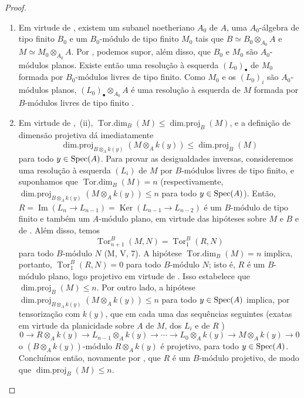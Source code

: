\begin{proof}
\begin{enumerate}[label=(\roman*)]
\item Em virtude de
, existem
um subanel noetheriano $A_0$
de $A$, uma $A_0$-álgebra
de tipo finito $B_0$ e um
$B_0$-módulo de tipo finito
$M_0$ tais que
$B\simeq B_0\otimes_{A_0}A$
e $M\simeq M_0\otimes_{A_0}A$.
Por , podemos
supor, além disso, que $B_0$
e $M_0$ são $A_0$-módulos
planos. Existe então uma
resolução à esquerda
$(L_0)_\bullet$ de $M_0$
formada por $B_0$-módulos
livres de tipo finito.
Como $M_0$ e os $(L_0)_i$
são $A_0$-módulos planos,
$(L_0)_\bullet\otimes_{A_0}A$
é uma resolução à esquerda
de $M$ formada por
$B$-módulos livres de
tipo finito
.

\item Em virtude de
,~(ii),
$\operatorname{Tor.dim}_B(M)\leqslant\operatorname{dim.proj}_B(M)$,
e a definição de dimensão
projetiva dá imediatamente
\[
\operatorname{dim.proj}_{B\otimes_A k(y)}(M\otimes_A k(y))
\leqslant\operatorname{dim.proj}_B(M)
\]
para todo $y\in\operatorname{Spec}(A)$.
Para provar as desigualdades
inversas, consideremos uma
resolução à esquerda $(L_i)$
de $M$ por $B$-módulos livres
de tipo finito, e suponhamos
que $\operatorname{Tor.dim}_B(M)=n$
(respectivamente,
$\operatorname{dim.proj}_{B\otimes_A k(y)}(M\otimes_A k(y))\leqslant n$
para todo $y\in\operatorname{Spec}(A)$).
Então,
$R=\operatorname{Im}(L_n\to L_{n-1})=\operatorname{Ker}(L_{n-1}\to L_{n-2})$
é um $B$-módulo de tipo
finito e também um $A$-módulo
plano, em virtude das hipóteses
sobre $M$ e $B$ e de
.
Além disso, temos
\[
\operatorname{Tor}_{n+1}^B(M,N)=\operatorname{Tor}_1^B(R,N)
\]
para todo $B$-módulo $N$
(M, V, 7). A hipótese
$\operatorname{Tor.dim}_B(M)=n$
implica, portanto,
$\operatorname{Tor}_1^B(R,N)=0$
para todo $B$-módulo $N$;
isto é, $R$ é um $B$-módulo
plano, logo projetivo em
virtude de .
Isso estabelece que
$\operatorname{dim.proj}_B(M)\leqslant n$.
Por outro lado, a hipótese
$\operatorname{dim.proj}_{B\otimes_A k(y)}(M\otimes_A k(y))\leqslant n$
para todo $y\in\operatorname{Spec}(A)$
implica, por tensorização
com $k(y)$, que em cada
uma das sequências seguintes
(exatas em virtude da
planicidade sobre $A$ de
$M$, dos $L_i$ e de $R$
)
\[
0\to R\otimes_A k(y)\to L_{n-1}\otimes_A k(y)
\to\cdots\to L_0\otimes_A k(y)\to M\otimes_A k(y)\to0
\]
o $(B\otimes_A k(y))$-módulo
$R\otimes_A k(y)$ é
projetivo, para todo
$y\in\operatorname{Spec}(A)$.
Concluímos então, novamente
por , que
$R$ é um $B$-módulo
projetivo, de modo que
$\operatorname{dim.proj}_B(M)\leqslant n$.
\end{enumerate}
\end{proof}

